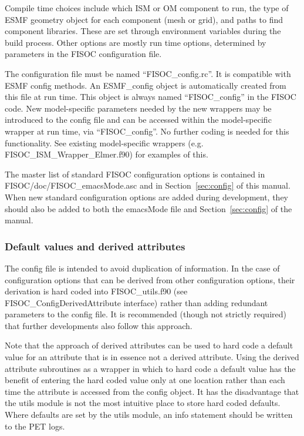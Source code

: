 \documentclass[11pt]{article}
\begin{document}
Compile time choices include which ISM or OM component to run, the type of ESMF
geometry object for each component (mesh or grid), and paths to find
component libraries.
These are set through environment variables during the build process.
Other options are mostly run time options, determined by parameters in the FISOC
configuration file. 

The configuration file must be named ``FISOC\_config.rc''.  
It is compatible with ESMF config methods.  
An ESMF\_config object is automatically created from this file at run time.
This object is always named ``FISOC\_config'' in the FISOC code.
New model-specific parameters needed by the new wrappers may be 
introduced to the config file and can be accessed 
within the model-specific wrapper at run time, via  ``FISOC\_config''. 
No further coding is needed for this functionality.
See existing model-specific wrappers (e.g. FISOC\_ISM\_Wrapper\_Elmer.f90) 
for examples of this.

The master list of standard FISOC configuration options is contained in 
FISOC/doc/FISOC\_emacsMode.asc and in Section~\ref{sec:config} of this 
manual. 
When new standard configuration options are added during development, they 
should also be added to both the emacsMode file and  
Section~\ref{sec:config} of the manual.


\subsubsection{Default values and derived attributes}

The config file is intended to avoid duplication of information.  
In the case of configuration options that can be derived from other 
configuration options, their derivation is hard coded into 
FISOC\_utils.f90 (see FISOC\_ConfigDerivedAttribute interface) 
rather than adding redundant parameters to the config file.
It is recommended (though not strictly required) that further developments 
also follow this approach. 

Note that the approach of derived attributes can be used to hard code a 
default value for an attribute that is in essence not a derived attribute. 
Using the derived attribute subroutines as a wrapper in which to hard 
code a default value has the benefit of entering the hard coded value 
only at one location rather than each time the attribute is accessed 
from the config object.
It has the disadvantage that the utils module is not the most intuitive
place to store hard coded defaults.
Where defaults are set by the utils module, an info statement should be written
to the PET logs. 
\end{document}
